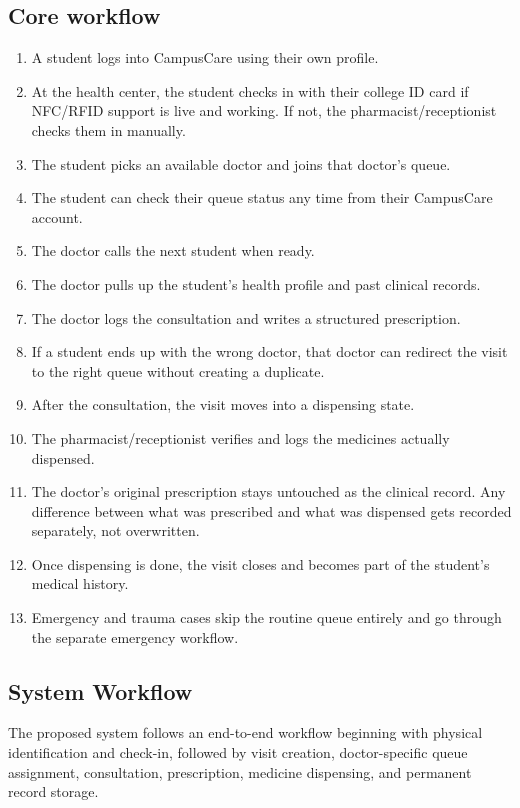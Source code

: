 \documentclass[11pt,a4paper]{article}
\begin{document}
\subsection{Core workflow}

\begin{enumerate}
    \item A student logs into CampusCare using their own profile.
    \item At the health center, the student checks in with their college ID card if NFC/RFID support is live and working. If not, the pharmacist/receptionist checks them in manually.
    \item The student picks an available doctor and joins that doctor's queue.
    \item The student can check their queue status any time from their CampusCare account.
    \item The doctor calls the next student when ready.
    \item The doctor pulls up the student's health profile and past clinical records.
    \item The doctor logs the consultation and writes a structured prescription.
    \item If a student ends up with the wrong doctor, that doctor can redirect the visit to the right queue without creating a duplicate.
    \item After the consultation, the visit moves into a dispensing state.
    \item The pharmacist/receptionist verifies and logs the medicines actually dispensed.
    \item The doctor's original prescription stays untouched as the clinical record. Any difference between what was prescribed and what was dispensed gets recorded separately, not overwritten.
    \item Once dispensing is done, the visit closes and becomes part of the student's medical history.
    \item Emergency and trauma cases skip the routine queue entirely and go through the separate emergency workflow.
\end{enumerate}

\subsection{System Workflow}

The proposed system follows an end-to-end workflow beginning with physical identification and check-in, followed by visit creation, doctor-specific queue assignment, consultation, prescription, medicine dispensing, and permanent record storage.
\end{document}
